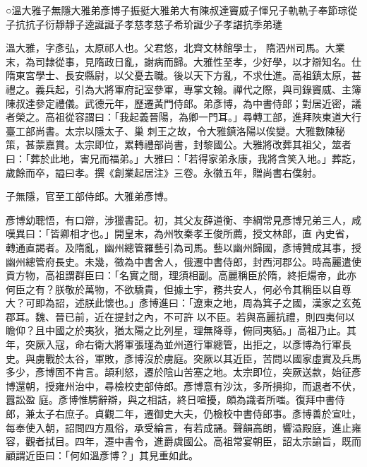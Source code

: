 
\begin{pinyinscope}

 ○溫大雅子無隱大雅弟彥博子振挺大雅弟大有陳叔達竇威子惲兄子軌軌子奉節琮從子抗抗子衍靜靜子逵誕誕子孝慈孝慈子希玠誕少子孝諶抗季弟璡



 溫大雅，字彥弘，太原祁人也。父君悠，北齊文林館學士，
 隋泗州司馬。大業末，為司隸從事，見隋政日亂，謝病而歸。大雅性至孝，少好學，以才辯知名。仕隋東宮學士、長安縣尉，以父憂去職。後以天下方亂，不求仕進。高祖鎮太原，甚禮之。義兵起，引為大將軍府記室參軍，專掌文翰。禪代之際，與司錄竇威、主簿陳叔達參定禮儀。武德元年，歷遷黃門侍郎。弟彥博，為中書侍郎；對居近密，議者榮之。高祖從容謂曰：「我起義晉陽，為卿一門耳。」尋轉工部，進拜陜東道大行臺工部尚書。太宗以隱太子、巢
 刺王之故，令大雅鎮洛陽以俟變。大雅數陳秘策，甚蒙嘉賞。太宗即位，累轉禮部尚書，封黎國公。大雅將改葬其祖父，筮者曰：「葬於此地，害兄而福弟。」大雅曰：「若得家弟永康，我將含笑入地。」葬訖，歲餘而卒，謚曰孝。撰《創業起居注》三卷。永徽五年，贈尚書右僕射。



 子無隱，官至工部侍郎。大雅弟彥博。



 彥博幼聰悟，有口辯，涉獵書記。初，其父友薛道衡、李綱常見彥博兄弟三人，咸嘆異曰：「皆卿相才也。」開皇末，為州牧秦孝王俊所薦，授文林郎，直
 內史省，轉通直謁者。及隋亂，幽州總管羅藝引為司馬。藝以幽州歸國，彥博贊成其事，授幽州總管府長史。未幾，徵為中書舍人，俄遷中書侍郎，封西河郡公。時高麗遣使貢方物，高祖謂群臣曰：「名實之間，理須相副。高麗稱臣於隋，終拒煬帝，此亦何臣之有？朕敬於萬物，不欲驕貴，但據土宇，務共安人，何必令其稱臣以自尊大？可即為詔，述朕此懷也。」彥博進曰：「遼東之地，周為箕子之國，漢家之玄菟郡耳。魏、晉已前，近在提封之內，不可許
 以不臣。若與高麗抗禮，則四夷何以瞻仰？且中國之於夷狄，猶太陽之比列星，理無降尊，俯同夷貊。」高祖乃止。其年，突厥入寇，命右衛大將軍張瑾為並州道行軍總管，出拒之，以彥博為行軍長史。與虜戰於太谷，軍敗，彥博沒於虜庭。突厥以其近臣，苦問以國家虛實及兵馬多少，彥博固不肯言。頡利怒，遷於陰山苦塞之地。太宗即位，突厥送款，始征彥博還朝，授雍州治中，尋檢校吏部侍郎。彥博意有沙汰，多所損抑，而退者不伏，囂訟盈
 庭。彥博惟騁辭辯，與之相詰，終日喧擾，頗為識者所嗤。復拜中書侍郎，兼太子右庶子。貞觀二年，遷御史大夫，仍檢校中書侍郎事。彥博善於宣吐，每奉使入朝，詔問四方風俗，承受綸言，有若成誦。聲韻高朗，響溢殿庭，進止雍容，觀者拭目。四年，遷中書令，進爵虞國公。高祖常宴朝臣，詔太宗諭旨，既而顧謂近臣曰：「何如溫彥博？」其見重如此。




\end{pinyinscope}
